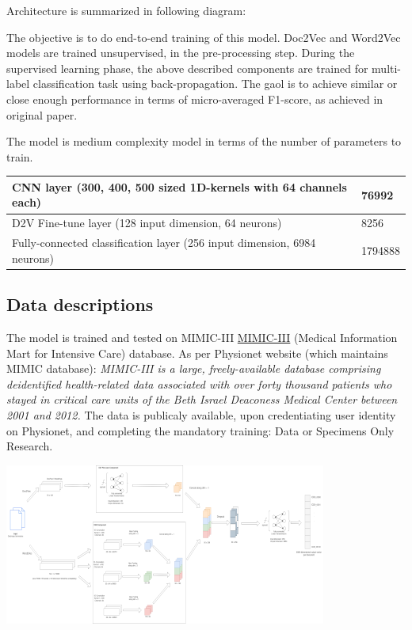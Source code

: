 \documentclass[11pt,a4paper]{article}
\begin{document}
Architecture is summarized in following diagram:

The objective is to do end-to-end training of this model. Doc2Vec and Word2Vec models are trained unsupervised, in the pre-processing step. During the supervised learning phase, the above described components are trained for multi-label classification task using back-propagation. The gaol is to achieve similar or close enough performance in terms of micro-averaged F1-score, as achieved in original paper.

The model is medium complexity model in terms of the number of parameters to train.
\newline

\begin{tiny}
\begin{tabular}{ ll }
  \hline
  	CNN layer (300, 400, 500 sized 1D-kernels with 64 channels each) & 76992 \\
  \hline
  	D2V Fine-tune layer (128 input dimension, 64 neurons) & 8256 \\
  \hline
  	Fully-connected classification layer (256 input dimension, 6984 neurons) & 1794888 \\
  \hline
\end{tabular}
\end{tiny}

\subsection{Data descriptions}

The model is trained and tested on MIMIC-III \href{https://physionet.org/content/mimiciii/1.4/}{MIMIC-III} (Medical Information Mart for Intensive Care) database. As per Physionet website (which maintains MIMIC database): \emph{MIMIC-III is a large, freely-available database comprising deidentified health-related data associated with over forty thousand patients who stayed in critical care units of the Beth Israel Deaconess Medical Center between 2001 and 2012.} The data is publicaly available, upon credentiating user identity on Physionet, and completing the mandatory training: Data or Specimens Only Research.

\includegraphics{architecture_scaled}
\end{document}
